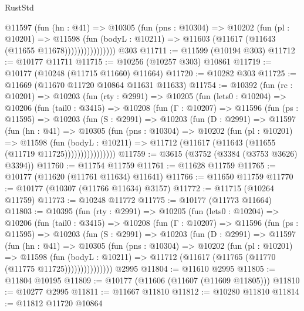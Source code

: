 \begin{lexlean}{RustStd}
\begin{coremodule}
                    @11597
                      (fun (hn : @41) =>
                      @10305
                        (fun (pns : @10304) =>
                        @10202
                          (fun (pl : @10201) =>
                          @11598
                            (fun (bodyL : @10211) =>
                            @11603 (@11617 (@11643 (@11655 @11678))))))))))))))))
    @303
@11711 := @11599 (@10194 @303)
@11712 := @10177 @11711
@11715 := @10256 (@10257 @303) @10861
@11719 := @10177 (@10248 (@11715 @11660) @11664)
@11720 := @10282 @303
@11725 := @11669 (@11670 @11720 @10864 @11631 @11633)
@11754 := @10392
    (fun (rc : @10201) =>
    @10203
      (fun (rty : @2991) =>
      @10205
        (fun (lets0 : @10204) =>
        @10206
          (fun (tail0 : @3415) =>
          @10208
            (fun (Γ : @10207) =>
            @11596
              (fun (ps : @11595) =>
              @10203
                (fun (S : @2991) =>
                @10203
                  (fun (D : @2991) =>
                  @11597
                    (fun (hn : @41) =>
                    @10305
                      (fun (pns : @10304) =>
                      @10202
                        (fun (pl : @10201) =>
                        @11598
                          (fun (bodyL : @10211) =>
                          @11712 (@11617 (@11643 (@11655 (@11719 @11725))))))))))))))))
@11759 := @3615 (@3752 (@3384 (@3753 @3626) @3394))
@11760 := @11754 @11759
@11761 := @11628 @11759
@11765 := @10177 (@11620 (@11761 @11634) @11641)
@11766 := @11650 @11759
@11770 := @10177 (@10307 (@11766 @11634) @3157)
@11772 := @11715 (@10264 @11759)
@11773 := @10248 @11772
@11775 := @10177 (@11773 @11664)
@11803 := @10395
    (fun (rty : @2991) =>
    @10205
      (fun (lets0 : @10204) =>
      @10206
        (fun (tail0 : @3415) =>
        @10208
          (fun (Γ : @10207) =>
          @11596
            (fun (ps : @11595) =>
            @10203
              (fun (S : @2991) =>
              @10203
                (fun (D : @2991) =>
                @11597
                  (fun (hn : @41) =>
                  @10305
                    (fun (pns : @10304) =>
                    @10202
                      (fun (pl : @10201) =>
                      @11598
                        (fun (bodyL : @10211) =>
                        @11712 (@11617 (@11765 (@11770 (@11775 @11725)))))))))))))))
    @2995
@11804 := @11610 @2995
@11805 := @11804 @10195
@11809 := @10177 (@11606 (@11607 (@11609 @11805)))
@11810 := @10277 @2995
@11811 := @11667 @11810
@11812 := @10280 @11810
@11814 := @11812 @11720 @10864

\end{coremodule}
\end{lexlean}
